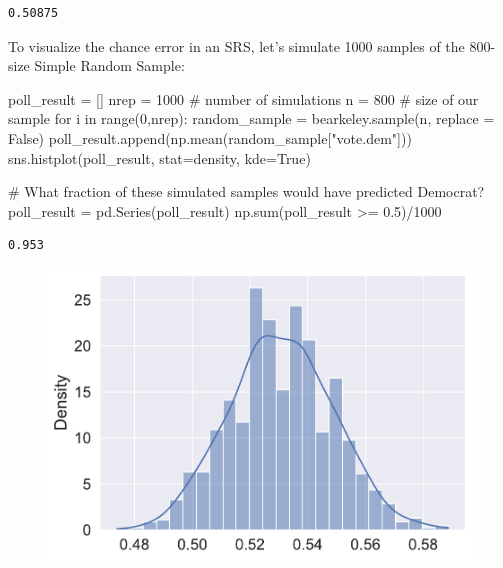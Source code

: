 \documentclass[
  letterpaper,
  DIV=11,
  numbers=noendperiod]{scrreprt}
\newenvironment{Shaded}{\begin{snugshade}}{\end{snugshade}}
\newcommand{\BuiltInTok}[1]{\textcolor[rgb]{0.00,0.23,0.31}{#1}}
\newcommand{\CommentTok}[1]{\textcolor[rgb]{0.37,0.37,0.37}{#1}}
\newcommand{\ControlFlowTok}[1]{\textcolor[rgb]{0.00,0.23,0.31}{#1}}
\newcommand{\DecValTok}[1]{\textcolor[rgb]{0.68,0.00,0.00}{#1}}
\newcommand{\FloatTok}[1]{\textcolor[rgb]{0.68,0.00,0.00}{#1}}
\newcommand{\KeywordTok}[1]{\textcolor[rgb]{0.00,0.23,0.31}{#1}}
\newcommand{\NormalTok}[1]{\textcolor[rgb]{0.00,0.23,0.31}{#1}}
\newcommand{\OperatorTok}[1]{\textcolor[rgb]{0.37,0.37,0.37}{#1}}
\newcommand{\StringTok}[1]{\textcolor[rgb]{0.13,0.47,0.30}{#1}}
\newcommand{\VariableTok}[1]{\textcolor[rgb]{0.07,0.07,0.07}{#1}}
\begin{document}
\begin{verbatim}
0.50875
\end{verbatim}

To visualize the chance error in an SRS, let's simulate 1000 samples of
the 800-size Simple Random Sample:

\begin{Shaded}
\begin{Highlighting}[]
\NormalTok{poll\_result }\OperatorTok{=}\NormalTok{ []}
\NormalTok{nrep }\OperatorTok{=} \DecValTok{1000}   \CommentTok{\# number of simulations}
\NormalTok{n }\OperatorTok{=} \DecValTok{800}       \CommentTok{\# size of our sample}
\ControlFlowTok{for}\NormalTok{ i }\KeywordTok{in} \BuiltInTok{range}\NormalTok{(}\DecValTok{0}\NormalTok{,nrep):}
\NormalTok{    random\_sample }\OperatorTok{=}\NormalTok{ bearkeley.sample(n, replace }\OperatorTok{=} \VariableTok{False}\NormalTok{)}
\NormalTok{    poll\_result.append(np.mean(random\_sample[}\StringTok{"vote.dem"}\NormalTok{]))}
\NormalTok{sns.histplot(poll\_result, stat}\OperatorTok{=}\StringTok{\textquotesingle{}density\textquotesingle{}}\NormalTok{, kde}\OperatorTok{=}\VariableTok{True}\NormalTok{)}

\CommentTok{\# What fraction of these simulated samples would have predicted Democrat?}
\NormalTok{poll\_result }\OperatorTok{=}\NormalTok{ pd.Series(poll\_result)}
\NormalTok{np.}\BuiltInTok{sum}\NormalTok{(poll\_result }\OperatorTok{\textgreater{}=} \FloatTok{0.5}\NormalTok{)}\OperatorTok{/}\DecValTok{1000}
\end{Highlighting}
\end{Shaded}

\begin{verbatim}
0.953
\end{verbatim}

\begin{figure}[H]

{\centering \includegraphics{sampling/sampling_files/figure-pdf/cell-11-output-2.pdf}

}

\end{figure}
\end{document}
